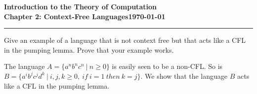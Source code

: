 \documentclass[11pt]{article}
\newcommand{\dated}{\today}
\begin{document}
\textbf{Introduction to the Theory of
Computation}\hfill\textbf{\myname}\\[0.01in]
\textbf{Chapter 2: Context-Free Languages}\hfill\textbf{\dated}\\
\smallskip\hrule\bigskip

\begin{problem}{2.36}
Give an example of a language that is not context free but that acts like a CFL in the pumping lemma. Prove that your example works.
\end{problem}

\begin{idea}
The language $A = \{a^nb^nc^n \ | \ n \geq 0 \}$ is easily seen to be a non-CFL. So is $B = \{a^ib^jc^jd^k \ | \ i,j,k \geq 0, \ if \ i = 1 \ then \ k = j \}$. We show that the language $B$ acts like a CFL in the pumping lemma.
\end{idea}
\end{document}
